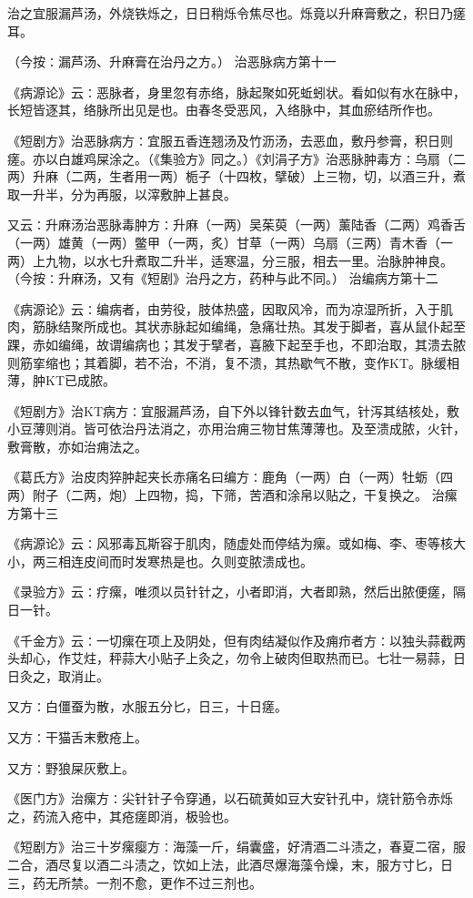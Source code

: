 \documentclass[a4paper,12pt,UTF8,twoside]{ctexbook}
\begin{document}
治之宜服漏芦汤，外烧铁烁之，日日稍烁令焦尽也。烁竟以升麻膏敷之，积日乃瘥耳。

（今按∶漏芦汤、升麻膏在治丹之方。）
治恶脉病方第十一

《病源论》云∶恶脉者，身里忽有赤络，脉起聚如死蚯蚓状。看如似有水在脉中，长短皆逐其，络脉所出见是也。由春冬受恶风，入络脉中，其血瘀结所作也。

《短剧方》治恶脉病方∶宜服五香连翘汤及竹沥汤，去恶血，敷丹参膏，积日则瘥。亦以白雄鸡屎涂之。（《集验方》同之。）《刘涓子方》治恶脉肿毒方∶乌扇（二两）升麻（二两，生者用一两）栀子（十四枚，擘破）上三物，切，以酒三升，煮取一升半，分为再服，以滓敷肿上甚良。

又云∶升麻汤治恶脉毒肿方∶升麻（一两）吴茱萸（一两）薰陆香（二两）鸡香舌（一两）雄黄（一两）鳖甲（一两，炙）甘草（一两）乌扇（三两）青木香（一两）上九物，以水七升煮取二升半，适寒温，分三服，相去一里。治脉肿神良。（今按∶升麻汤，又有《短剧》治丹之方，药种与此不同。）
治编病方第十二

《病源论》云∶编病者，由劳役，肢体热盛，因取风冷，而为凉湿所折，入于肌肉，筋脉结聚所成也。其状赤脉起如编绳，急痛壮热。其发于脚者，喜从鼠仆起至踝，赤如编绳，故谓编病也；其发于擘者，喜腋下起至手也，不即治取，其溃去脓则筋挛缩也；其着脚，若不治，不消，复不溃，其热歇气不散，变作KT。脉缓相薄，肿KT已成脓。

《短剧方》治KT病方∶宜服漏芦汤，自下外以锋针数去血气，针泻其结核处，敷小豆薄则消。皆可依治丹法消之，亦用治痈三物甘焦薄薄也。及至溃成脓，火针，敷膏散，亦如治痈法之。

《葛氏方》治皮肉猝肿起夹长赤痛名曰编方∶鹿角（一两）白（一两）牡蛎（四两）附子（二两，炮）上四物，捣，下筛，苦酒和涂帛以贴之，干复换之。
治瘰方第十三

《病源论》云∶风邪毒瓦斯容于肌肉，随虚处而停结为瘰。或如梅、李、枣等核大小，两三相连皮间而时发寒热是也。久则变脓溃成也。

《录验方》云∶疗瘰，唯须以员针针之，小者即消，大者即熟，然后出脓便瘥，隔日一针。

《千金方》云∶一切瘰在项上及阴处，但有肉结凝似作及痈疖者方∶以独头蒜截两头却心，作艾炷，秤蒜大小贴子上灸之，勿令上破肉但取热而已。七壮一易蒜，日日灸之，取消止。

又方∶白僵蚕为散，水服五分匕，日三，十日瘥。

又方∶干猫舌末敷疮上。

又方∶野狼屎灰敷上。

《医门方》治瘰方∶尖针针子令穿通，以石硫黄如豆大安针孔中，烧针筋令赤烁之，药流入疮中，其疮瘥即消，极验也。

《短剧方》治三十岁瘰瘿方∶海藻一斤，绢囊盛，好清酒二斗渍之，春夏二宿，服二合，酒尽复以酒二斗渍之，饮如上法，此酒尽爆海藻令燥，末，服方寸匕，日三，药无所禁。一剂不愈，更作不过三剂也。
\end{document}
